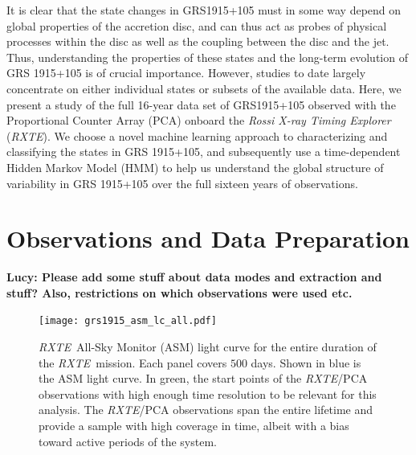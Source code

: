 \documentclass[12pt]{emulateapj}
\newcommand{\project}[1]{\textsl{#1}}
\newcommand{\rxte}{\project{RXTE}}
\begin{document}
%

It is clear that the state changes in GRS1915+105 must in some way depend on global properties of the accretion disc, and can thus act as probes of physical processes within the disc as well as the coupling between the disc and the jet. Thus, understanding the properties of these states and the long-term evolution of GRS 1915+105 is of crucial importance. However, studies to date largely concentrate on either individual states or subsets of the available data. 
Here, we present a study of the full 16-year data set of GRS1915+105 observed with the Proportional Counter Array (PCA) onboard the \textit{Rossi X-ray Timing Explorer} (\rxte). We choose a novel machine learning approach to characterizing and classifying the states in GRS 1915+105, and subsequently use a time-dependent Hidden Markov Model (HMM) to help us understand the global structure of variability in GRS 1915+105 over the full sixteen years of observations.


\section{Observations and Data Preparation}

{\bf Lucy: Please add some stuff about data modes and extraction and stuff? Also, restrictions on which observations were used etc.}

\begin{figure}[htbp]
\begin{center}
\texttt{[image: grs1915\_asm\_lc\_all.pdf]}
\caption{\rxte\ All-Sky Monitor (ASM) light curve for the entire duration of the \rxte\ mission. Each panel covers $500$ days. Shown in blue is the ASM light curve. In green, the start points of the \rxte/PCA observations with high enough time resolution to be relevant for this analysis. The \rxte/PCA observations span the entire lifetime and provide a 
sample with high coverage in time, albeit with a bias toward active periods of the system.}
\label{fig:asm_total}
\end{center}
\end{figure}
\end{document}
